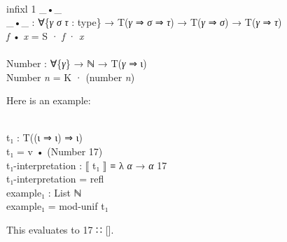 \documentclass{entcs} \usepackage{prentcsmacro}
\newcommand{\AgdaFontStyle}[1]{\textsf{#1}}
\newcommand{\AgdaBoundFontStyle}[1]{\textit{#1}}
\newcommand{\AgdaKeyword}     [1]
    {\AgdaFontStyle{\textcolor{AgdaKeyword}{#1}}}
\newcommand{\AgdaNumber}      [1]{\textcolor{AgdaNumber}{#1}}
\newcommand{\AgdaSymbol}      [1]{\textcolor{AgdaSymbol}{#1}}
\newcommand{\AgdaBound}    [1]{\AgdaBoundFontStyle{\textcolor{AgdaBound}{#1}}}
\newcommand{\AgdaInductiveConstructor}[1]
    {\AgdaFontStyle{\textcolor{AgdaInductiveConstructor}{#1}}}
\newcommand{\AgdaDatatype} [1]{\AgdaFontStyle{\textcolor{AgdaDatatype}{#1}}}
\newcommand{\AgdaFunction} [1]{\AgdaFontStyle{\textcolor{AgdaFunction}{#1}}}
\newcommand{\AgdaCodeStyle}{\small}
\newenvironment{code}%
{\noindent\AgdaCodeStyle\pboxed}%
{\endpboxed\par\noindent%
\ignorespacesafterend}
\begin{document}
\begin{code}\>\<%
\\
\>\AgdaKeyword{infixl} \AgdaNumber{1} \_•\_\<%
\\
\>\AgdaFunction{\_•\_} \AgdaSymbol{:} \AgdaSymbol{∀\{}\AgdaBound{γ} \AgdaBound{σ} \AgdaBound{τ} \AgdaSymbol{:} \AgdaDatatype{type}\AgdaSymbol{\}} \AgdaSymbol{→} \AgdaDatatype{T}\AgdaSymbol{(}\AgdaBound{γ} \AgdaInductiveConstructor{⇒} \AgdaBound{σ} \AgdaInductiveConstructor{⇒} \AgdaBound{τ}\AgdaSymbol{)} \AgdaSymbol{→} \AgdaDatatype{T}\AgdaSymbol{(}\AgdaBound{γ} \AgdaInductiveConstructor{⇒} \AgdaBound{σ}\AgdaSymbol{)} \AgdaSymbol{→} \AgdaDatatype{T}\AgdaSymbol{(}\AgdaBound{γ} \AgdaInductiveConstructor{⇒} \AgdaBound{τ}\AgdaSymbol{)}\<%
\\
\>\AgdaBound{f} \AgdaFunction{•} \AgdaBound{x} \AgdaSymbol{=} \AgdaInductiveConstructor{S} \AgdaInductiveConstructor{·} \AgdaBound{f} \AgdaInductiveConstructor{·} \AgdaBound{x} \<[18]%
\>[18]\<%
\\
%
\\
\>\AgdaFunction{Number} \AgdaSymbol{:} \AgdaSymbol{∀\{}\AgdaBound{γ}\AgdaSymbol{\}} \AgdaSymbol{→} \AgdaDatatype{ℕ} \AgdaSymbol{→} \AgdaDatatype{T}\AgdaSymbol{(}\AgdaBound{γ} \AgdaInductiveConstructor{⇒} \AgdaInductiveConstructor{ι}\AgdaSymbol{)}\<%
\\
\>\AgdaFunction{Number} \AgdaBound{n} \AgdaSymbol{=} \AgdaInductiveConstructor{K} \AgdaInductiveConstructor{·} \AgdaSymbol{(}\AgdaFunction{number} \AgdaBound{n}\AgdaSymbol{)}\<%
\\
\>\<\end{code}
Here is an example:

\begin{code}\>\<%
\\
\>\AgdaFunction{t₁} \AgdaSymbol{:} \AgdaDatatype{T}\AgdaSymbol{((}\AgdaInductiveConstructor{ι} \AgdaInductiveConstructor{⇒} \AgdaInductiveConstructor{ι}\AgdaSymbol{)} \AgdaInductiveConstructor{⇒} \AgdaInductiveConstructor{ι}\AgdaSymbol{)}\<%
\\
\>\AgdaFunction{t₁} \AgdaSymbol{=} \AgdaFunction{v} \AgdaFunction{•} \AgdaSymbol{(}\AgdaFunction{Number} \AgdaNumber{17}\AgdaSymbol{)}\<%
\\
\>\AgdaFunction{t₁-interpretation} \AgdaSymbol{:} \AgdaFunction{⟦} \AgdaFunction{t₁} \AgdaFunction{⟧} \AgdaDatatype{≡} \AgdaSymbol{λ} \AgdaBound{α} \AgdaSymbol{→} \AgdaBound{α} \AgdaNumber{17}\<%
\\
\>\AgdaFunction{t₁-interpretation} \AgdaSymbol{=} \AgdaInductiveConstructor{refl}\<%
\\
\>\AgdaFunction{example₁} \AgdaSymbol{:} \AgdaDatatype{List} \AgdaDatatype{ℕ}\<%
\\
\>\AgdaFunction{example₁} \AgdaSymbol{=} \AgdaFunction{mod-unif} \AgdaFunction{t₁}\<%
\\
\>\<\end{code}
This evaluates to 17 ∷ [].
\end{document}
